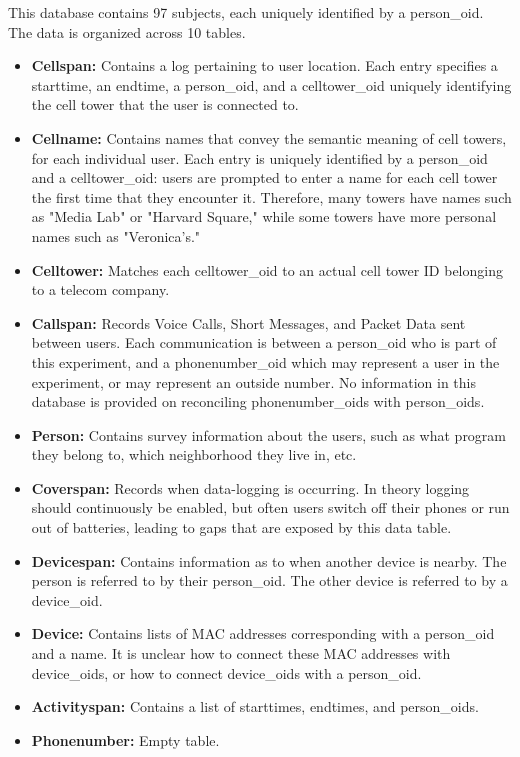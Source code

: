 \documentclass[pageno]{jpaper}
\begin{document}
This database contains 97 subjects, each uniquely identified by a person\_oid. The data is organized across 10 tables. 
\begin{itemize}
\item \textbf{Cellspan:} Contains a log pertaining to user location. Each entry specifies a starttime, an endtime, a person\_oid, and a celltower\_oid uniquely identifying the cell tower that the user is connected to.
\item \textbf{Cellname:} Contains names that convey the semantic meaning of cell towers, for each individual user. Each entry is uniquely identified by a person\_oid and a celltower\_oid: users are prompted to enter a name for each cell tower the first time that they encounter it. Therefore, many towers have names such as "Media Lab" or "Harvard Square," while some towers have more personal names such as "Veronica's."
\item \textbf{Celltower:} Matches each celltower\_oid to an actual cell tower ID belonging to a telecom company. 
\item \textbf{Callspan:} Records Voice Calls, Short Messages, and Packet Data sent between users. Each communication is between a person\_oid who is part of this experiment, and a phonenumber\_oid which may represent a user in the experiment, or may represent an outside number. No information in this database is provided on reconciling phonenumber\_oids with person\_oids.
\item \textbf{Person:} Contains survey information about the users, such as what program they belong to, which neighborhood they live in, etc.
\item \textbf{Coverspan:} Records when data-logging is occurring. In theory logging should continuously be enabled, but often users switch off their phones or run out of batteries, leading to gaps that are exposed by this data table.
\item \textbf{Devicespan:} Contains information as to when another device is nearby. The person is referred to by their person\_oid. The other device is referred to by a device\_oid.
\item \textbf{Device:} Contains lists of MAC addresses corresponding with a person\_oid and a name. It is unclear how to connect these MAC addresses with device\_oids, or how to connect device\_oids with a person\_oid.
\item \textbf{Activityspan:} Contains a list of starttimes, endtimes, and person\_oids. 
\item \textbf{Phonenumber:} Empty table.
\end{itemize}
\end{document}
